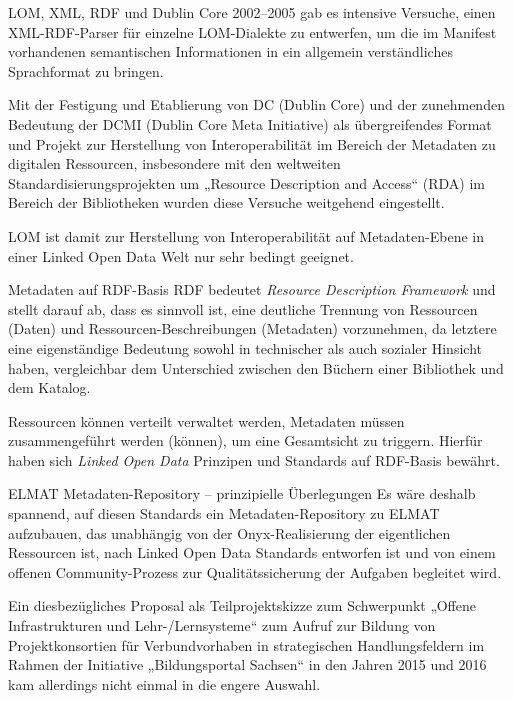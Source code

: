 \documentclass{beamer}
\begin{document}
\begin{frame}{LOM, XML, RDF und Dublin Core}
2002--2005 gab es intensive Versuche, einen XML-RDF-Parser für einzelne
LOM-Dialekte zu entwerfen, um die im Manifest vorhandenen semantischen
Informationen in ein allgemein verständliches Sprachformat zu bringen.

Mit der Festigung und Etablierung von DC (Dublin Core) und der zunehmenden
Bedeutung der DCMI (Dublin Core Meta Initiative) als übergreifendes Format und
Projekt zur Herstellung von Interoperabilität im Bereich der Metadaten zu
digitalen Ressourcen, insbesondere mit den weltweiten
Standardisierungsprojekten um „Resource Description and Access“ (RDA) im
Bereich der Bibliotheken wurden diese Versuche weitgehend eingestellt. 

LOM ist damit zur Herstellung von Interoperabilität auf Metadaten-Ebene in
einer Linked Open Data Welt nur sehr bedingt geeignet.
\end{frame}

\begin{frame}{Metadaten auf RDF-Basis}
RDF bedeutet \emph{Resource Description Framework} und stellt darauf ab, dass
es sinnvoll ist, eine deutliche Trennung von Ressourcen (Daten) und
Ressourcen-Beschreibungen (Metadaten) vorzunehmen, da letztere eine
eigenständige Bedeutung sowohl in technischer als auch sozialer Hinsicht haben,
vergleichbar dem Unterschied zwischen den Büchern einer Bibliothek und dem
Katalog.  

Ressourcen können verteilt verwaltet werden, Metadaten müssen zusammengeführt
werden (können), um eine Gesamtsicht zu triggern. Hierfür haben sich
\emph{Linked Open Data} Prinzipen und Standards auf RDF-Basis bewährt. 
\end{frame}

\begin{frame}{ELMAT Metadaten-Repository -- prinzipielle Überlegungen}
Es wäre deshalb spannend, auf diesen Standards ein Metadaten-Repository zu
ELMAT aufzubauen, das unabhängig von der Onyx-Realisierung der eigentlichen
Ressourcen ist, nach Linked Open Data Standards entworfen ist und von einem
offenen Community-Prozess zur Qualitätssicherung der Aufgaben begleitet wird. 

Ein diesbezügliches Proposal als Teilprojektskizze zum Schwerpunkt „Offene
Infrastrukturen und Lehr-/Lernsysteme“ zum Aufruf zur Bildung von
Projektkonsortien für Verbundvorhaben in strategischen Handlungsfeldern im
Rahmen der Initiative „Bildungsportal Sachsen“ in den Jahren 2015 und 2016 kam
allerdings nicht einmal in die engere Auswahl.
\end{frame}
\end{document}
